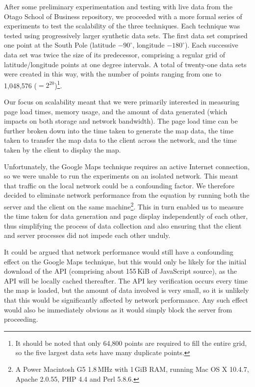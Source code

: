 \documentclass[acmtocl,acmnow]{acmtrans2m}
\begin{document}
After some preliminary experimentation and testing with live data from
the Otago School of Business repository, we proceeded with a more formal
series of experiments to test the scalability of the three techniques.
Each technique was tested using progressively larger synthetic data
sets. The first data set comprised one point at the South Pole (latitude
\(-90^{\circ}\), longitude \(-180^{\circ}\)). Each successive data set
was twice the size of its predecessor, comprising a regular grid of
latitude/longitude points at one degree intervals. A total of twenty-one
data sets were created in this way, with the number of points ranging
from one to 1,048,576 (\(=2^{20}\))\footnote{It should be noted that
only 64,800 points are required to fill the entire grid, so the five
largest data sets have many duplicate points.}.

Our focus on scalability meant that we were primarily interested in
measuring page load times, memory usage, and the amount of data
generated (which impacts on both storage and network bandwidth). The
page load time can be further broken down into the time taken to
generate the map data, the time taken to transfer the map data to the
client across the network, and the time taken by the client to display
the map.

Unfortunately, the Google Maps technique requires an active Internet
connection, so we were unable to run the experiments on an isolated
network. This meant that traffic on the local network could be a
confounding factor. We therefore decided to eliminate network
performance from the equation by running both the server and the client
on the same machine\footnote{A Power Macintosh G5 1.8\,MHz with 1\,GiB
RAM, running Mac OS X 10.4.7, Apache 2.0.55, PHP 4.4 and Perl 5.8.6.}.
This in turn enabled us to measure the time taken for data generation
and page display independently of each other, thus simplifying the
process of data collection and also ensuring that the client and server
processes did not impede each other unduly.

It could be argued that network performance would still have a
confounding effect on the Google Maps technique, but this would only be
likely for the initial download of the API (comprising about 155\,KiB of
JavaScript source), as the API will be locally cached thereafter. The
API key verification occurs every time the map is loaded, but the amount
of data involved is very small, so it is unlikely that this would be
significantly affected by network performance. Any such effect would
also be immediately obvious as it would simply block the server from
proceeding.
\end{document}
